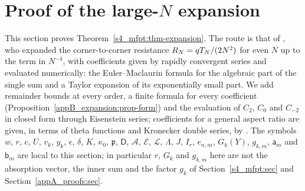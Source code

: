 %
\providecommand{\appBp}{\mathfrak{p}}   %
\providecommand{\appBD}{\mathsf{D}}     %
\providecommand{\appBA}{\mathcal{A}}    %
\providecommand{\appBE}{\mathcal{E}}    %
\providecommand{\appBL}{\mathcal{L}}    %
\providecommand{\appBa}{\mathsf{a}}     %
\providecommand{\appBb}{\mathsf{b}}     %
\section{Proof of the large-\texorpdfstring{$N$}{N} expansion}\label{appB_expansion:sec}

This section proves Theorem~\ref{s4_mfpt:thm-expansion}. The route is that of \citet{EssamWu2009}, who expanded
the corner-to-corner resistance $R_N=qT_{N}/(2N^{2})$ for even $N$ up to the term in $N^{-4}$, with coefficients
given by rapidly convergent series and evaluated numerically: the Euler--Maclaurin formula for the algebraic part
of the single sum and a Taylor expansion of its exponentially small part. We add remainder bounds at every order, a finite formula for every coefficient
(Proposition~\ref{appB_expansion:prop-form}) and the evaluation of $C_{2}$, $C_{0}$ and $C_{-2}$ in closed form
through Eisenstein series; coefficients for a general aspect ratio are given, in terms of theta functions and
Kronecker double series, by \citet{IzmailianHuang2010}. The symbols $w$, $r$, $c$, $U$, $v_k$, $y_k$, $\epsilon$, $\delta$, $K$, $\kappa_0$,
$\appBp$, $\appBD$, $\appBA$, $\appBE$, $\appBL$, $\Lambda$, $J$, $I_r$, $e_{n,m}$, $G_k(Y)$, $g_{k,m}$, $\appBa_m$
and $\appBb_m$ are local to this section; in particular $r$, $G_k$ and $g_{k,m}$ here are not the absorption
vector, the inner sum and the factor $g_k$ of Section~\ref{s4_mfpt:sec} and Section~\ref{appA_proofs:sec}.

